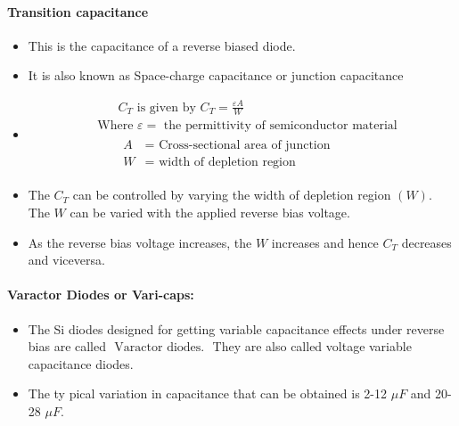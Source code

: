\paragraph{Transition capacitance}  
\begin{itemize}
\item  This is the capacitance of a reverse biased diode.
\item  It is also known as Space-charge capacitance or junction capacitance
\item $$\begin{aligned}
&\qquad C_{T} \text { is given by } C_{T}=\frac{\varepsilon A}{W} \\
&\text { Where } \varepsilon=\text { the permittivity of semiconductor material } \\
&\qquad 
\begin{aligned}
A &=\text { Cross-sectional area of junction } \\
W &=\text { width of depletion region }
\end{aligned}
\end{aligned}$$
\item  The $C_{T}$ can be controlled by varying the width of depletion region $(W)$. The $W$ can be varied with the applied reverse bias voltage.
\item As the reverse bias voltage increases, the $W$ increases and hence $C_{T}$ decreases and viceversa.
\end{itemize}
\paragraph{Varactor Diodes or Vari-caps:}
\begin{itemize}
\item The Si diodes designed for getting variable capacitance effects under reverse bias are called ${\text { Varactor diodes. }}$ They are also called voltage variable capacitance diodes.
\item  The ty pical variation in capacitance that can be obtained is 2-12 $\mu F$ and 20-28 $\mu F$.
\end{itemize}
